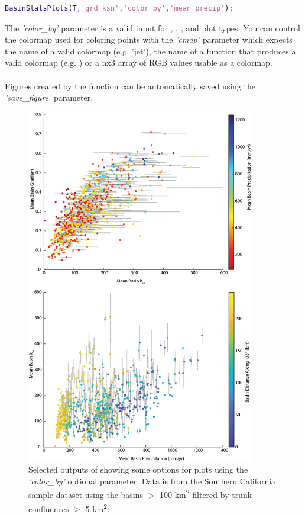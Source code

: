 \begin{lstlisting}[language=Matlab]
% To color a plot of mean gradient vs mean ksn by mean precipitation, and assuming the mean precipitation is stored in a column named 'mean_precip' in the input table, T
BasinStatsPlots(T,'grd_ksn','color_by','mean_precip');
\end{lstlisting}

\noindent
The \textit{'color\_by'} parameter is a valid input for , , , and  plot types. You can control the colormap used for coloring points with the \textit{'cmap'} parameter which expects the name of a valid colormap (e.g. 'jet'), the name of a function that produces a valid colormap (e.g. ) or a nx3 array of RGB values usable as a colormap.

\paragraph{}Figures created by the function can be automatically saved using the \textit{'save\_figure'} parameter. 

\begin{figure}[H]
	\centering
	\includegraphics[width=10cm]{PNGs/BasinStats.png}
	\caption{Selected outputs of  showing some options for plots using the \textit{'color\_by'} optional parameter. Data is from the Southern California sample dataset using the basins $>$ 100 km\textsuperscript{2}  filtered by trunk confluences $>$ 5 km\textsuperscript{2}.}
	\label{fig:BsnSts}
\end{figure}

